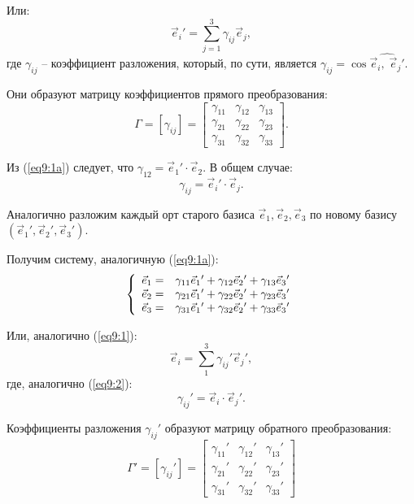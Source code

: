 	Или:
	\begin{equation}
	\vec{e}_i{'} = \sum\limits_{j=1}^3 \gamma_{ij}\vec{e}_j, \label{eq9:1}
	\end{equation}
	 где \( \gamma_{ij} \) -- коэффициент разложения, который, по сути, является \( \gamma_{ij} = \cos\widehat{\vec{e}_i,\; \vec{e}_j{'}} \).
	 
	Они образуют матрицу коэффициентов прямого преобразования:
	\[ \Gamma = [\gamma_{ij}] = \begin{bmatrix}
	\gamma_{11} & \gamma_{12} & \gamma_{13} \\
	\gamma_{21} & \gamma_{22} & \gamma_{23} \\
	\gamma_{31} & \gamma_{32} & \gamma_{33}
	\end{bmatrix}. \]
	
	Из (\ref{eq9:1a}) следует, что \( \gamma_{12} = \vec{e}_1{'}\cdot\vec{e}_2 \). В общем случае:
	\begin{equation}
	\gamma_{ij} = \vec{e}_i{'}\cdot\vec{e}_j. \label{eq9:2} 
	\end{equation}
	
	Аналогично разложим каждый орт старого базиса \( \vec{e}_1, \vec{e}_2, \vec{e}_3 \) по новому базису \( (\vec{e}_1{'}, \vec{e}_2{'}, \vec{e}_3{'}) \).
	
	Получим систему, аналогичную (\ref{eq9:1a}):
	\[ \left\{ \begin{array}{l l}
    		\vec{e}_1 = & \gamma_{11}\vec{e}_1{'} + \gamma_{12}\vec{e}_2{'} + \gamma_{13}\vec{e}_3{'}  \\
    		\vec{e}_2 = & \gamma_{21}\vec{e}_1{'} + \gamma_{22}\vec{e}_2{'} + \gamma_{23}\vec{e}_3{'}  \\
    		\vec{e}_3 = & \gamma_{31}\vec{e}_1{'} + \gamma_{32}\vec{e}_2{'} + \gamma_{33}\vec{e}_3{'}
  	\end{array} \right. \]
  	
	Или, аналогично (\ref{eq9:1}):
	\begin{equation}
	\vec{e}_i = \sum\limits_1^3 \gamma_{ij}'\vec{e}_j{'}, \label{eq9:3}
	\end{equation}
	где, аналогично (\ref{eq9:2}):
	\begin{equation} 
	\gamma_{ij}' = \vec{e}_i\cdot\vec{e}_j{'}. \label{eq9:4}
	\end{equation}	
	
	Коэффициенты разложения \( \gamma_{ij}' \) образуют матрицу обратного преобразования:
	\[ \Gamma' = [\gamma_{ij}'] = \begin{bmatrix}
	\gamma_{11}' & \gamma_{12}' & \gamma_{13}' \\
	\gamma_{21}' & \gamma_{22}' & \gamma_{23}' \\
	\gamma_{31}' & \gamma_{32}' & \gamma_{33}'
	\end{bmatrix} \]
	
